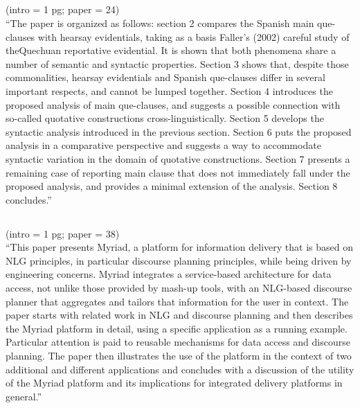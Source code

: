 \documentclass{article}
\begin{document}
\subsection{\cite{etxepareevd10}} 
(intro = 1 pg; paper = 24)\\
``The paper is organized as follows: section 2 compares the Spanish main que-clauses with hearsay evidentials,
taking as a basis Faller’s (2002) careful study of theQuechuan reportative evidential. It is shown that both phenomena
share a number of semantic and syntactic properties. Section 3 shows that, despite those commonalities, hearsay
evidentials and Spanish que-clauses differ in several important respects, and cannot be lumped together. Section 4
introduces the proposed analysis of main que-clauses, and suggests a possible connection with so-called quotative
constructions cross-linguistically. Section 5 develops the syntactic analysis introduced in the previous section.
Section 6 puts the proposed analysis in a comparative perspective and suggests a way to accommodate syntactic
variation in the domain of quotative constructions. Section 7 presents a remaining case of reporting main clause that
does not immediately fall under the proposed analysis, and provides a minimal extension of the analysis. Section 8
concludes.''

\subsection{\cite{parisetaldiscourse09}}
(intro = 1 pg; paper = 38)\\
``This paper presents Myriad, a platform for information delivery that is based on
NLG principles, in particular discourse planning principles, while being driven by
engineering concerns. Myriad integrates a service-based architecture for data access,
not unlike those provided by mash-up tools, with an NLG-based discourse planner
that aggregates and tailors that information for the user in context. The paper starts
with related work in NLG and discourse planning and then describes the Myriad
platform in detail, using a specific application as a running example. Particular
attention is paid to reusable mechanisms for data access and discourse planning.
The paper then illustrates the use of the platform in the context of two additional
and different applications and concludes with a discussion of the utility of the
Myriad platform and its implications for integrated delivery platforms in general.''
\end{document}
